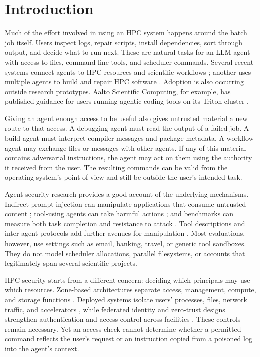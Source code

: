 \section{Introduction}
\label{sec:intro}

Much of the effort involved in using an HPC system happens around the batch job itself. Users inspect logs, repair scripts, install dependencies, sort through output, and decide what to run next. These are natural tasks for an LLM agent with access to files, command-line tools, and scheduler commands. Several recent systems connect agents to HPC resources and scientific workflows \cite{Ma2025HPCAgent,Rosendo2025ORNL,Dawson2026LARA}; another uses multiple agents to build and repair HPC software \cite{Mondesire2025PEARC}. Adoption is also occurring outside research prototypes. Aalto Scientific Computing, for example, has published guidance for users running agentic coding tools on its Triton cluster \cite{AaltoSciComp2026}.

Giving an agent enough access to be useful also gives untrusted material a new route to that access. A debugging agent must read the output of a failed job. A build agent must interpret compiler messages and package metadata. A workflow agent may exchange files or messages with other agents. If any of this material contains adversarial instructions, the agent may act on them using the authority it received from the user. The resulting commands can be valid from the operating system's point of view and still be outside the user's intended task.

Agent-security research provides a good account of the underlying mechanisms. Indirect prompt injection can manipulate applications that consume untrusted content \cite{Greshake2023PromptInjection}; tool-using agents can take harmful actions \cite{Ruan2024ToolEmu}; and benchmarks can measure both task completion and resistance to attack \cite{Debenedetti2024AgentDojo}. Tool descriptions and inter-agent protocols add further avenues for manipulation \cite{Shi2025ToolHijacker,Ferrag2025ProtocolExploits,Wang2026PILandscape}. Most evaluations, however, use settings such as email, banking, travel, or generic tool sandboxes. They do not model scheduler allocations, parallel filesystems, or accounts that legitimately span several scientific projects.

HPC security starts from a different concern: deciding which principals may use which resources. Zone-based architectures separate access, management, compute, and storage functions \cite{NIST2024SP800223}. Deployed systems isolate users' processes, files, network traffic, and accelerators \cite{Prout2024UserSeparation}, while federated identity and zero-trust designs strengthen authentication and access control across facilities \cite{Alam2024ZeroTrust}. These controls remain necessary. Yet an access check cannot determine whether a permitted command reflects the user's request or an instruction copied from a poisoned log into the agent's context.

